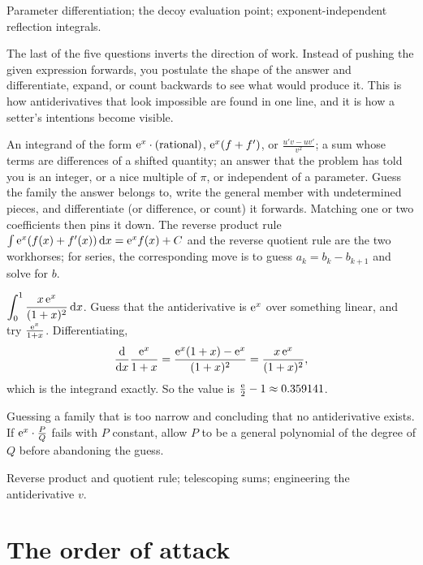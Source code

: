 \begin{seealsob}Parameter differentiation; the decoy evaluation point; exponent-independent reflection integrals.\end{seealsob}

The last of the five questions inverts the direction of work. Instead of pushing the given expression forwards, you postulate the shape of the answer and differentiate, expand, or count backwards to see what would produce it. This is how antiderivatives that look impossible are found in one line, and it is how a setter's intentions become visible.

\cue An integrand of the form $\mathrm{e}^{x}\cdot(\text{rational})$, $\mathrm{e}^{x}(f+f')$, or $\frac{u'v-uv'}{v^{2}}$; a sum whose terms are differences of a shifted quantity; an answer that the problem has told you is an integer, or a nice multiple of $\pi$, or independent of a parameter.
\method Guess the family the answer belongs to, write the general member with undetermined pieces, and differentiate (or difference, or count) it forwards. Matching one or two coefficients then pins it down. The reverse product rule $\int \mathrm{e}^{x}(f(x)+f'(x))\,\mathrm{d} x=\mathrm{e}^{x}f(x)+C$ and the reverse quotient rule are the two workhorses; for series, the corresponding move is to guess $a_{k}=b_{k}-b_{k+1}$ and solve for $b$.

\begin{worked}
$\displaystyle\int_{0}^{1}\frac{x\,\mathrm{e}^{x}}{(1+x)^{2}}\,\mathrm{d} x$. Guess that the antiderivative is $\mathrm{e}^{x}$ over something linear, and try $\frac{\mathrm{e}^{x}}{1+x}$. Differentiating,
\[
\frac{\mathrm{d}}{\mathrm{d}x}\frac{\mathrm{e}^{x}}{1+x}=\frac{\mathrm{e}^{x}(1+x)-\mathrm{e}^{x}}{(1+x)^{2}}=\frac{x\,\mathrm{e}^{x}}{(1+x)^{2}},
\]
which is the integrand exactly. So the value is $\frac{\mathrm{e}}{2}-1\approx 0.359141$.
\end{worked}

\begin{trap}
Guessing a family that is too narrow and concluding that no antiderivative exists. If $\mathrm{e}^{x}\cdot\frac{P}{Q}$ fails with $P$ constant, allow $P$ to be a general polynomial of the degree of $Q$ before abandoning the guess.
\end{trap}

\begin{seealsob}Reverse product and quotient rule; telescoping sums; engineering the antiderivative $v$.\end{seealsob}

\section{The order of attack}


